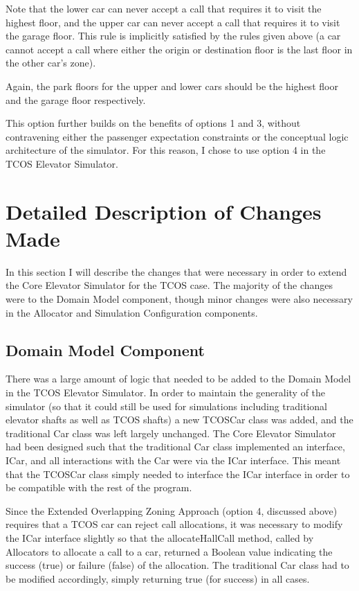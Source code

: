 \documentclass{UoYCSproject}
\begin{document}
Note that the lower car can never accept a call that requires it to visit the highest floor, and the upper car can never accept a call that requires it to visit the garage floor.  This rule is implicitly satisfied by the rules given above (a car cannot accept a call where either the origin or destination floor is the last floor in the other car's zone).

Again, the park floors for the upper and lower cars should be the highest floor and the garage floor respectively.

This option further builds on the benefits of options 1 and 3, without contravening either the passenger expectation constraints or the conceptual logic architecture of the simulator.  For this reason, I chose to use option 4 in the TCOS Elevator Simulator.

\section{Detailed Description of Changes Made}

In this section I will describe the changes that were necessary in order to extend the Core Elevator Simulator for the TCOS case.  The majority of the changes were to the Domain Model component, though minor changes were also necessary in the Allocator and Simulation Configuration components.

\subsection{Domain Model Component}

There was a large amount of logic that needed to be added to the Domain Model in the TCOS Elevator Simulator.  In order to maintain the generality of the simulator (so that it could still be used for simulations including traditional elevator shafts as well as TCOS shafts) a new TCOSCar class was added, and the traditional Car class was left largely unchanged.  The Core Elevator Simulator had been designed such that the traditional Car class implemented an interface, ICar, and all interactions with the Car were via the ICar interface.  This meant that the TCOSCar class simply needed to interface the ICar interface in order to be compatible with the rest of the program.

Since the Extended Overlapping Zoning Approach (option 4, discussed above) requires that a TCOS car can reject call allocations, it was necessary to modify the ICar interface slightly so that the allocateHallCall method, called by Allocators to allocate a call to a car, returned a Boolean value indicating the success (true) or failure (false) of the allocation.  The traditional Car class had to be modified accordingly, simply returning true (for success) in all cases.
\end{document}
